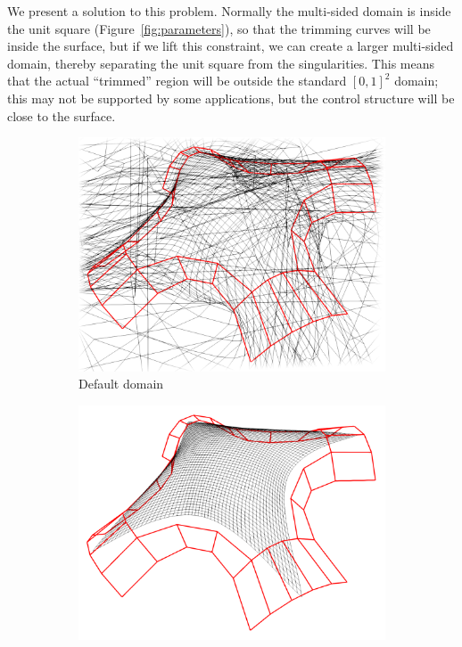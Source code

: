 \documentclass[9pt,academicons]{article}
\begin{document}
We present a solution to this problem. Normally the multi-sided domain is inside the unit
square (Figure~\ref{fig:parameters}), so that the trimming curves will be inside the
surface, but if we lift this constraint, we can create a larger multi-sided domain,
thereby separating the unit square from the singularities. This means that the actual ``trimmed''
region will be outside the standard $[0,1]^2$ domain; this may not be supported by some
applications, but the control structure will be close to the surface.
\begin{figure}
  \begin{subfigure}{.3\textwidth}
    \centering
    \includegraphics[width=\textwidth]{images/8sided-1.png}
    \caption{Default domain}
    \label{fig:8sided-default}
  \end{subfigure}
  \hfill
  \begin{subfigure}{.3\textwidth}
    \centering
    \includegraphics[width=\textwidth]{images/8sided-2.png}

\end{subfigure}
\end{figure}
\end{document}
